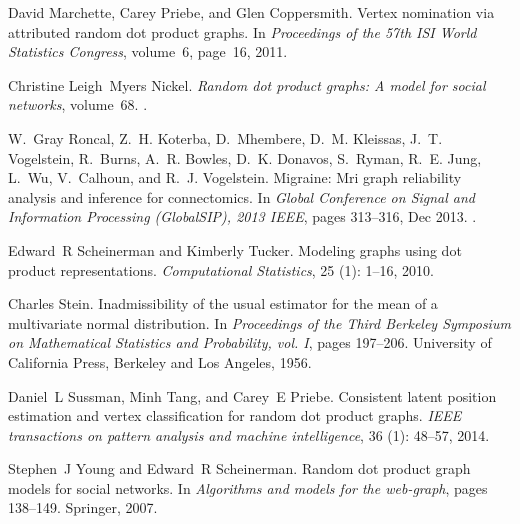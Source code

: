 \documentclass[10pt,letterpaper]{article}
\begin{document}
\begin{thebibliography}{10}
David Marchette, Carey Priebe, and Glen Coppersmith.
\newblock Vertex nomination via attributed random dot product graphs.
\newblock In \emph{Proceedings of the 57th ISI World Statistics Congress},
  volume~6, page~16, 2011.

Christine Leigh~Myers Nickel.
\newblock \emph{Random dot product graphs: A model for social networks},
  volume~68.
.

W.~Gray Roncal, Z.~H. Koterba, D.~Mhembere, D.~M. Kleissas, J.~T. Vogelstein,
  R.~Burns, A.~R. Bowles, D.~K. Donavos, S.~Ryman, R.~E. Jung, L.~Wu,
  V.~Calhoun, and R.~J. Vogelstein.
\newblock Migraine: Mri graph reliability analysis and inference for
  connectomics.
\newblock In \emph{Global Conference on Signal and Information Processing
  (GlobalSIP), 2013 IEEE}, pages 313--316, Dec 2013.
\newblock {}.

Edward~R Scheinerman and Kimberly Tucker.
\newblock Modeling graphs using dot product representations.
\newblock \emph{Computational Statistics}, 25 (1): 1--16,
  2010.

Charles Stein.
\newblock Inadmissibility of the usual estimator for the mean of a multivariate
  normal distribution.
\newblock In \emph{Proceedings of the {T}hird {B}erkeley {S}ymposium on
  {M}athematical {S}tatistics and {P}robability, vol. {I}}, pages 197--206.
  University of California Press, Berkeley and Los Angeles, 1956.

Daniel~L Sussman, Minh Tang, and Carey~E Priebe.
\newblock Consistent latent position estimation and vertex classification for
  random dot product graphs.
\newblock \emph{IEEE transactions on pattern analysis and machine
  intelligence}, 36 (1): 48--57, 2014.

Stephen~J Young and Edward~R Scheinerman.
\newblock Random dot product graph models for social networks.
\newblock In \emph{Algorithms and models for the web-graph}, pages 138--149.
  Springer, 2007.


\end{thebibliography}
\end{document}
